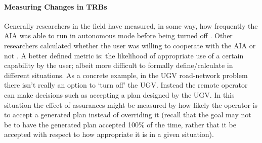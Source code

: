 \begin{itemize}
    \paragraph{Measuring Changes in TRBs} Generally researchers in the field have measured, in some way, how frequently the AIA was able to run in autonomous mode before being turned off \cite{Freedy2007-sg,Desai2012-rc}. Other researchers calculated whether the user was willing to cooperate with the AIA or not \cite{Salem2015-md,Wu2016-ei,Bainbridge2011-pl}. A better defined metric is: the likelihood of appropriate use of a certain capability by the user; albeit more difficult to formally define/calculate in different situations. As a concrete example, in the UGV road-network problem there isn't really an option to `turn off' the UGV. Instead the remote operator can make decisions such as accepting a plan designed by the UGV. In this situation the effect of assurances might be measured by how likely the operator is to accept a generated plan instead of overriding it (recall that the goal may not be to have the generated plan accepted 100\% of the time, rather that it be accepted with respect to how appropriate it is in a given situation).


\end{itemize}
